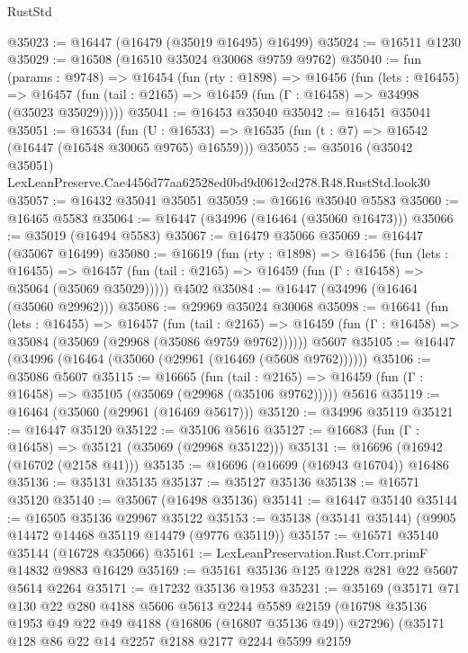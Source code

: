 \begin{lexlean}{RustStd}
\begin{coremodule}
@35023 := @16447 (@16479 (@35019 @16495) @16499)
@35024 := @16511 @1230
@35029 := @16508 (@16510 @35024 @30068 @9759 @9762)
@35040 := fun (params : @9748) =>
  @16454
    (fun (rty : @1898) =>
    @16456
      (fun (lets : @16455) =>
      @16457 (fun (tail : @2165) => @16459 (fun (Γ : @16458) => @34998 (@35023 @35029)))))
@35041 := @16453 @35040
@35042 := @16451 @35041
@35051 := @16534
    (fun (U : @16533) => @16535 (fun (t : @7) => @16542 (@16447 (@16548 @30065 @9765) @16559)))
@35055 := @35016
    (@35042 @35051)
    LexLeanPreserve.Cae4456d77aa62528ed0bd9d0612cd278.R48.RustStd.look30
@35057 := @16432 @35041 @35051
@35059 := @16616 @35040 @5583
@35060 := @16465 @5583
@35064 := @16447 (@34996 (@16464 (@35060 @16473)))
@35066 := @35019 (@16494 @5583)
@35067 := @16479 @35066
@35069 := @16447 (@35067 @16499)
@35080 := @16619
    (fun (rty : @1898) =>
    @16456
      (fun (lets : @16455) =>
      @16457 (fun (tail : @2165) => @16459 (fun (Γ : @16458) => @35064 (@35069 @35029)))))
    @4502
@35084 := @16447 (@34996 (@16464 (@35060 @29962)))
@35086 := @29969 @35024 @30068
@35098 := @16641
    (fun (lets : @16455) =>
    @16457
      (fun (tail : @2165) =>
      @16459 (fun (Γ : @16458) => @35084 (@35069 (@29968 (@35086 @9759 @9762))))))
    @5607
@35105 := @16447 (@34996 (@16464 (@35060 (@29961 (@16469 (@5608 @9762))))))
@35106 := @35086 @5607
@35115 := @16665
    (fun (tail : @2165) => @16459 (fun (Γ : @16458) => @35105 (@35069 (@29968 (@35106 @9762)))))
    @5616
@35119 := @16464 (@35060 (@29961 (@16469 @5617)))
@35120 := @34996 @35119
@35121 := @16447 @35120
@35122 := @35106 @5616
@35127 := @16683 (fun (Γ : @16458) => @35121 (@35069 (@29968 @35122)))
@35131 := @16696 (@16942 (@16702 (@2158 @41)))
@35135 := @16696 (@16699 (@16943 @16704)) @16486
@35136 := @35131 @35135
@35137 := @35127 @35136
@35138 := @16571 @35120
@35140 := @35067 (@16498 @35136)
@35141 := @16447 @35140
@35144 := @16505 @35136 @29967 @35122
@35153 := @35138 (@35141 @35144) (@9905 @14472 @14468 @35119 @14479 (@9776 @35119))
@35157 := @16571 @35140 @35144 (@16728 @35066)
@35161 := LexLeanPreservation.Rust.Corr.primF @14832 @9883 @16429
@35169 := @35161 @35136 @125 @1228 @281 @22 @5607 @5614 @2264
@35171 := @17232 @35136 @1953
@35231 := @35169
    (@35171
      @71
      @130
      @22
      @280
      @4188
      @5606
      @5613
      @2244
      @5589
      @2159
      (@16798 @35136 @1953 @49 @22 @49 @4188 (@16806 (@16807 @35136 @49)) @27296)
      (@35171
        @128
        @86
        @22
        @14
        @2257
        @2188
        @2177
        @2244
        @5599
        @2159

\end{coremodule}
\end{lexlean}
